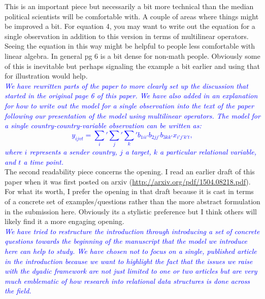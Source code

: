 This is an important piece but necessarily a bit more technical than the median political scientists will be comfortable with. A couple of areas where things might be improved a bit. For equation 4, you may want to write out the equation for a single observation in addition to this version in terms of multilinear operators. Seeing the equation in this way might be helpful to people less comfortable with linear algebra. In general pg 6 is a bit dense for non-math people. Obviously some of this is inevitable but perhaps signaling the example a bit earlier and using that for illustration would help. \\

\textcolor{blue}{\emph{
	We have rewritten parts of the paper to more clearly set up the discussion that started in the original page 6 of this paper. We have also added in an explanation for how to write out the model for a single observation into the text of the paper following our presentation of the model using multilinear operators. The model for a single country-country-variable observation can be written as: 
	\begin{equation}
	y_{ijvt} = \sum_i' \sum_j' \sum_k' b_{1ii'} b_{2jj'} b_{3kk'} x_{i'j'k't} ,  
	\end{equation}
	where $i$ represents a sender country, $j$ a target, $k$ a particular relational variable, and $t$ a time point. 
}} \\

The second readability piece concerns the opening. I read an earlier draft of this paper when it was first posted on arxiv (\url{http://arxiv.org/pdf/1504.08218.pdf}). For what its worth, I prefer the opening in that draft because it is cast in terms of a concrete set of examples/questions rather than the more abstract formulation in the submission here. Obviously its a stylistic preference but I think others will likely find it a more engaging opening. \\

\textcolor{blue}{\emph{
	We have tried to restructure the introduction through introducing a set of concrete questions towards the beginning of the manuscript that the model we introduce here can help to study. We have chosen not to focus on a single, published article in the introduction because we want to highlight the fact that the issues we raise with the dyadic framework are not just limited to one or two articles but are very much emblematic of how research into relational data structures is done across the field.
}} \\

